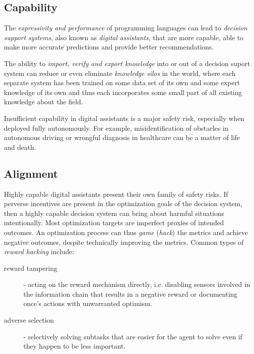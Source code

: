 \subsection{Capability}

The \emph{expressivity and performance} of programming languages can lead to \emph{decision support systems}, also known as \emph{digital assistants}, that are more capable, able to make more accurate predictions and provide better recommendations.

The ability to \emph{import, verify and export knowledge} into or out of a decision suport system can reduce or even eliminate \emph{knowledge silos} in the world, where each separate system has been trained on some data set of its own and some expert knowledge of its own and thus each incorporates some small part of all existing knowledge about the field. 

Insufficient capability in digital assistants is a major safety risk, especially when deployed fully autonomously. For example, misidentification of obstacles in autonomous driving \cite{sheebajoiceObstacleDetectionSafe2023} or wrongful diagnosis in healthcare \cite{wintersDiagnosticErrorsIntensive2012} can be a matter of life and death.

\subsection{Alignment}
\label{sec:alignment}

Highly capable digital assistants present their own family of safety risks. 
If perverse incentives are present in the optimization goals of the decision system, then a highly capable decision system can bring about harmful situations intentionally.
Most optimization targets are imperfect proxies of intended outcomes. 
An optimization process can thus \emph{game} (\emph{hack}) the metrics and achieve negative outcomes, despite technically improving the metrics.
Common types of \emph{reward hacking} \cite{skalseDefiningCharacterizingReward2022} include:
\begin{description}
    \item[reward tampering] \cite{everittRewardTamperingProblems2021, skalseInvariancePolicyOptimisation2023} - acting on the reward mechanism directly, i.e. disabling sensors involved in the information chain that results in a negative reward or documenting once's actions with unwarranted optimism.
    \item[adverse selection] - selectively solving subtasks that are easier for the agent to solve even if they happen to be less important.
\end{description}

